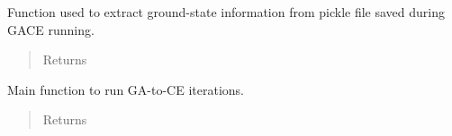 \documentclass[letterpaper,10pt,english]{sphinxmanual}
\begin{document}
\begin{fulllineitems}
\begin{fulllineitems}
\begin{quote}
\begin{description}
\end{description}\end{quote}

\end{fulllineitems}


\begin{fulllineitems}
\label{\detokenize{pygace.examples.sto:pygace.examples.sto.sto_gace.Runner.print_gs}}
Function used to extract ground-state information from pickle file
saved during GACE running.
\begin{quote}\begin{description}
\item[{Returns}] \leavevmode\begin{description}
\item[{}] \leavevmode
\end{description}

\end{description}\end{quote}

\end{fulllineitems}


\begin{fulllineitems}
\label{\detokenize{pygace.examples.sto:pygace.examples.sto.sto_gace.Runner.run}}
Main function to run GA-to-CE iterations.
\begin{quote}\begin{description}
\item[{Returns}] \leavevmode\begin{description}
\item[{}] \leavevmode
\end{description}

\end{description}\end{quote}

\end{fulllineitems}


\end{fulllineitems}

\end{document}
